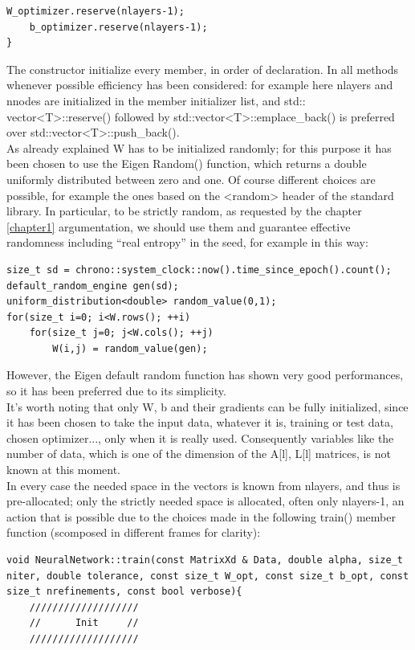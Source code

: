 \documentclass[12pt, a4paper]{report}
\theoremstyle{definition}
\begin{document}
{\begin{lstlisting}[frame=single, showstringspaces=false]
	W_optimizer.reserve(nlayers-1);
	b_optimizer.reserve(nlayers-1);
}
\end{lstlisting}
The constructor initialize every member, in order of declaration. In all methods whenever possible efficiency has been considered: for example here {\ttfamily nlayers} and {\ttfamily nnodes} are initialized in the member initializer list, and {\ttfamily std:: vector<T>::reserve()} followed by {\ttfamily std::vector<T>::emplace\_back()} is preferred over {\ttfamily std::vector<T>::push\_back()}.\\
As already explained {\ttfamily W} has to be initialized randomly; for this purpose it has been chosen to use the Eigen {\ttfamily Random()} function, which returns a double uniformly distributed between zero and one. Of course different choices are possible, for example the ones based on the {\ttfamily <random>} header of the standard library. In particular, to be strictly random, as requested by the chapter \ref{chapter1} argumentation, we should use them and guarantee effective randomness including ``real entropy'' in the seed, for example in this way:
\begin{lstlisting}[frame=single, showstringspaces=false]
size_t sd = chrono::system_clock::now().time_since_epoch().count();
default_random_engine gen(sd);
uniform_distribution<double> random_value(0,1);
for(size_t i=0; i<W.rows(); ++i)
	for(size_t j=0; j<W.cols(); ++j)
		W(i,j) = random_value(gen);
\end{lstlisting}
However, the Eigen default random function has shown very good performances, so it has been preferred due to its simplicity.\\
It's worth noting that only {\ttfamily W}, {\ttfamily b} and their gradients can be fully initialized, since it has been chosen to take the input data, whatever it is, training or test data, chosen optimizer..., only when it is really used. Consequently variables like the number of data, which is one of the dimension of the {\ttfamily A[l], L[l]} matrices, is not known at this moment.\\
In every case the needed space in the vectors is known from {\ttfamily nlayers}, and thus is pre-allocated; only the strictly needed space is allocated, often only {\ttfamily nlayers-1}, an action that is possible due to the choices made in the following {\ttfamily train()} member function (scomposed in different frames for clarity):
\begin{lstlisting}[frame=single, showstringspaces=false]
void NeuralNetwork::train(const MatrixXd & Data, double alpha, size_t niter, double tolerance, const size_t W_opt, const size_t b_opt, const size_t nrefinements, const bool verbose){                     
	///////////////////
	//      Init     //
	///////////////////


\end{lstlisting}}
\end{document}
